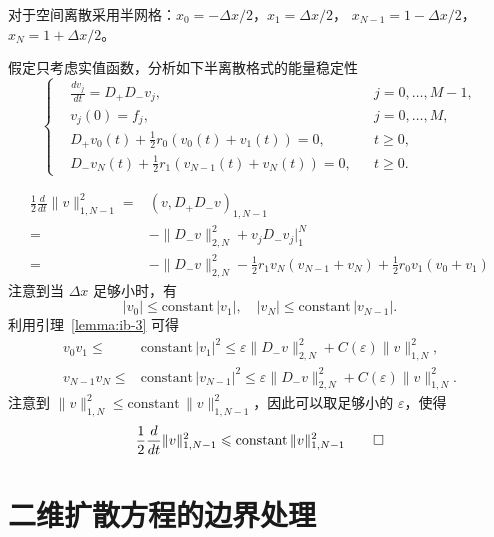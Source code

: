 对于空间离散采用半网格：$x_0 = -\Delta x/2$，$x_1 = \Delta x/2$，
$x_{N-1} = 1-\Delta x/2$，$x_N = 1+\Delta x/2$。


\begin{example}
    假定只考虑实值函数，分析如下半离散格式的能量稳定性
    \[
        \left\{
        \begin{aligned}
             & \frac{d v_j}{d t} = D_+ D_- v_j,                    &  & j=0,\dots,M-1, \\
             & v_j(0) = f_j,                                       &  & j=0,\dots,M,   \\
             & D_+ v_0(t) + \frac12 r_0 (v_0(t) + v_1(t)) = 0,     &  & t \ge 0,       \\
             & D_- v_N(t) + \frac12 r_1 (v_{N-1}(t) + v_N(t)) = 0, &  & t \ge 0.
        \end{aligned}
        \right.
    \]
\end{example}

\begin{solution*}
    \begin{align*}
        \frac12 \frac{d}{dt} \|v\|_{1,N-1}^2
        ={} & \left( v,D_+ D_- v \right)_{1,N-1}                                             \\
        ={} & - \| D_- v\|_{2,N}^2 + v_j D_- v_j \big|_1^N                                   \\
        ={} & - \| D_- v\|_{2,N}^2 - \frac12 r_1 v_N(v_{N-1}+v_N) + \frac12 r_0 v_1(v_0+v_1)
    \end{align*}
    注意到当 $\Delta x$ 足够小时，有
    \[
        |v_0| \le \text{constant}\, |v_1|,\quad
        |v_N| \le \text{constant}\, |v_{N-1}|.
    \]
    利用引理~\ref{lemma:ib-3} 可得
    \begin{align*}
        v_0 v_1 \le{}     & \text{constant}\, |v_1|^2 \le \varepsilon \|D_-v\|_{2,N}^2 + C(\varepsilon) \|v\|_{1,N}^2,     \\
        v_{N-1} v_N \le{} & \text{constant}\, |v_{N-1}|^2 \le \varepsilon \|D_-v\|_{2,N}^2 + C(\varepsilon) \|v\|_{1,N}^2.
    \end{align*}
    注意到 $\|v\|_{1,N}^2 \le \text{constant}\, \|v\|_{1,N-1}^2$，因此可以取足够小的 $\varepsilon$，使得
    \[
        \frac12 \frac{d}{dt} \|v\|_{1,N-1}^2 \le \text{constant}\, \|v\|_{1,N-1}^2 \qedhere
    \]
\end{solution*}


\section{二维扩散方程的边界处理}

